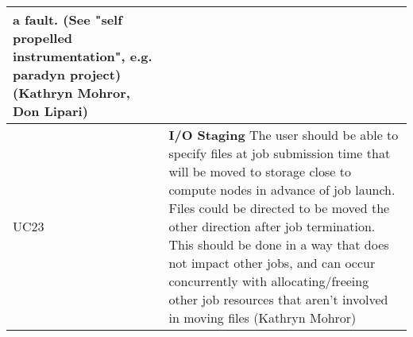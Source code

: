 \begin{longtable}{|p{1cm}|p{15cm}|}
	a fault. (See "self propelled instrumentation", e.g. paradyn project)
	(Kathryn Mohror, Don Lipari)\\
  \hline
  UC23 & \textbf{I/O Staging}\newline
	The user should be able to specify files at job submission time that
	will be moved to storage close to compute nodes in advance of job
	launch. Files could be directed to be moved the other direction
	after job termination. This should be done in a way that does not
	impact other jobs, and can occur concurrently with allocating/freeing
	other job resources that aren't involved in moving files (Kathryn
	Mohror)\\
  \hline
\end{longtable}
